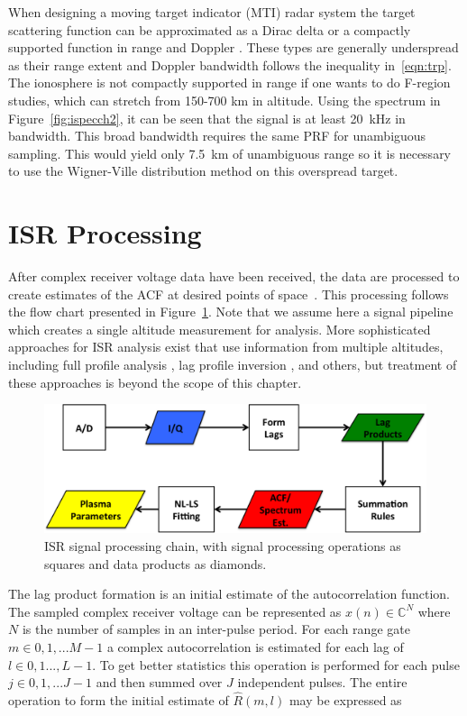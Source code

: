When designing a moving target indicator (MTI) radar system the target scattering function can be approximated as a Dirac delta or a compactly supported function in range and Doppler \cite{richards2014fundamentals}. 
These types are generally underspread as their range extent and Doppler bandwidth follows the inequality in~\eqref{eqn:trp}. 
The ionosphere is not compactly supported in range if one wants to do F-region studies, which can stretch from 150-700 km in altitude. 
Using the spectrum in Figure~\ref{fig:ispecch2}, it can be seen that the signal is at least 20~kHz in bandwidth.
This broad bandwidth requires the same PRF for unambiguous sampling. 
This would yield only 7.5~km of unambiguous range so it is necessary to use the Wigner-Ville distribution method on this overspread target. 




\section{ISR Processing}\label{section:isrproc}
After complex receiver voltage data have been received, the data are processed to create estimates of the ACF at desired points of space~\cite{farley1969,nygren1996}. 
This processing follows the flow chart presented in Figure~\ref{fig:chain}.  
Note that we assume here a signal pipeline which creates a single altitude measurement for analysis. 
More sophisticated approaches for ISR analysis exist that use information from multiple altitudes, including full profile analysis \cite{RDS:RDS3308}, lag profile inversion \cite{Virtanen:20082vx}, and others, but treatment of these approaches is beyond the scope of this chapter.
\begin{figure}[!t]
\centering
\includegraphics[width=5.5in]{datastackchain}
\caption{ISR signal processing chain, with signal processing operations as squares and data products as diamonds.}
\label{fig:chain}
\end{figure}
The lag product formation is an initial estimate of the autocorrelation function. The sampled complex receiver voltage can be represented as $x(n) \in\mathbb{C}^N$ where $N$ is the number of samples in an inter-pulse period. For each range gate $m\in 0,1,...M-1$ a complex autocorrelation is estimated for each lag of $l \in 0,1...,L-1$.  To get better statistics this operation is performed for each pulse $j\in 0,1,...J-1$ and then summed over $J$ independent pulses. The entire operation to form the initial estimate of $\widehat{R}(m,l)$ may be expressed as

